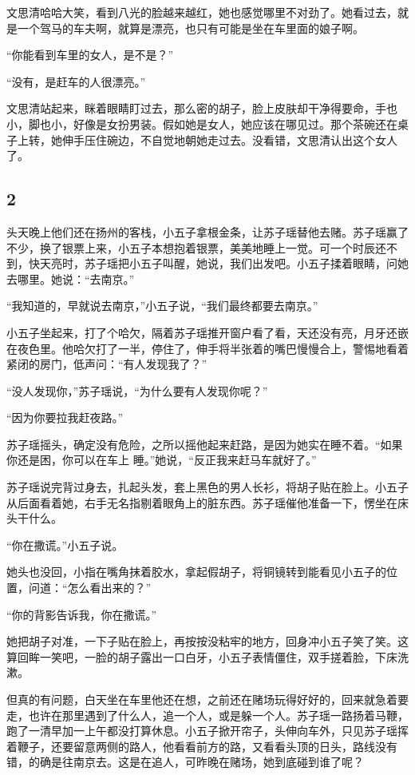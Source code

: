 文思清哈哈大笑，看到八光的脸越来越红，她也感觉哪里不对劲了。她看过去，就是一个驾马的车夫啊，就算是漂亮，也只有可能是坐在车里面的娘子啊。

“你能看到车里的女人，是不是？”

“没有，是赶车的人很漂亮。”

文思清站起来，眯着眼睛盯过去，那么密的胡子，脸上皮肤却干净得要命，手也小，脚也小，好像是女扮男装。假如她是女人，她应该在哪见过。那个茶碗还在桌子上转，她伸手压住碗边，不自觉地朝她走过去。没看错，文思清认出这个女人了。
\newline

{\centering\subsection{2}}

头天晚上他们还在扬州的客栈，小五子拿根金条，让苏子瑶替他去赌。苏子瑶赢了不少，换了银票上来，小五子本想抱着银票，美美地睡上一觉。可一个时辰还不到，快天亮时，苏子瑶把小五子叫醒，她说，我们出发吧。小五子揉着眼睛，问她去哪里。她说：“去南京。”

“我知道的，早就说去南京，”小五子说，“我们最终都要去南京。”

小五子坐起来，打了个哈欠，隔着苏子瑶推开窗户看了看，天还没有亮，月牙还嵌在夜色里。他哈欠打了一半，停住了，伸手将半张着的嘴巴慢慢合上，警惕地看着紧闭的房门，低声问：“有人发现我了？”

“没人发现你，”苏子瑶说，“为什么要有人发现你呢？”

“因为你要拉我赶夜路。”

苏子瑶摇头，确定没有危险，之所以摇他起来赶路，是因为她实在睡不着。“如果你还是困，你可以在车上
睡。”她说，“反正我来赶马车就好了。”

苏子瑶说完背过身去，扎起头发，套上黑色的男人长衫，将胡子贴在脸上。小五子从后面看着她，右手无名指剔着眼角上的脏东西。苏子瑶催他准备一下，愣坐在床头干什么。

“你在撒谎。”小五子说。

她头也没回，小指在嘴角抹着胶水，拿起假胡子，将铜镜转到能看见小五子的位置，问道：“怎么看出来的？”

“你的背影告诉我，你在撒谎。”

她把胡子对准，一下子贴在脸上，再按按没粘牢的地方，回身冲小五子笑了笑。这算回眸一笑吧，一脸的胡子露出一口白牙，小五子表情僵住，双手搓着脸，下床洗漱。

但真的有问题，白天坐在车里他还在想，之前还在赌场玩得好好的，回来就急着要走，也许在那里遇到了什么人，追一个人，或是躲一个人。苏子瑶一路扬着马鞭，跑了一清早加一上午都没打算休息。小五子掀开帘子，头伸向车外，只见苏子瑶挥着鞭子，还要留意两侧的路人，他看看前方的路，又看看头顶的日头，路线没有错，的确是往南京去。这是在追人，可昨晚在赌场，她到底碰到谁了呢？

